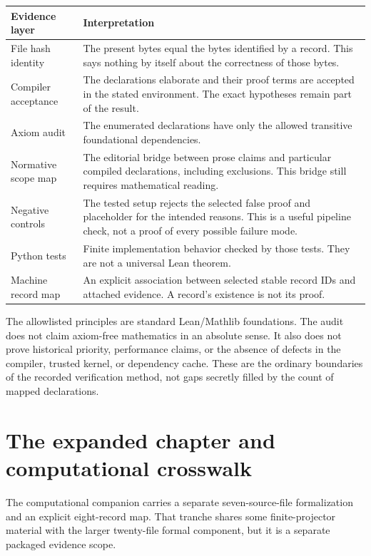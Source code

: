 \documentclass[11pt,a4paper]{article}
\begin{document}
\begin{longtable}{p{}p{}}
\toprule Evidence layer & Interpretation \\\midrule\endhead
File hash identity & The present bytes equal the bytes identified by a record. This says nothing by itself about the correctness of those bytes. \\
Compiler acceptance & The declarations elaborate and their proof terms are accepted in the stated environment. The exact hypotheses remain part of the result. \\
Axiom audit & The enumerated declarations have only the allowed transitive foundational dependencies. \\
Normative scope map & The editorial bridge between prose claims and particular compiled declarations, including exclusions. This bridge still requires mathematical reading. \\
Negative controls & The tested setup rejects the selected false proof and placeholder for the intended reasons. This is a useful pipeline check, not a proof of every possible failure mode. \\
Python tests & Finite implementation behavior checked by those tests. They are not a universal Lean theorem. \\
Machine record map & An explicit association between selected stable record IDs and attached evidence. A record's existence is not its proof. \\
\bottomrule
\end{longtable}

The allowlisted principles are standard Lean/Mathlib foundations. The audit does not claim axiom-free mathematics in an absolute sense. It also does not prove historical priority, performance claims, or the absence of defects in the compiler, trusted kernel, or dependency cache. These are the ordinary boundaries of the recorded verification method, not gaps secretly filled by the count of mapped declarations.

\section{The expanded chapter and computational crosswalk}

The computational companion carries a separate seven-source-file formalization and an explicit eight-record map. That tranche shares some finite-projector material with the larger twenty-file formal component, but it is a separate packaged evidence scope.
\end{document}
